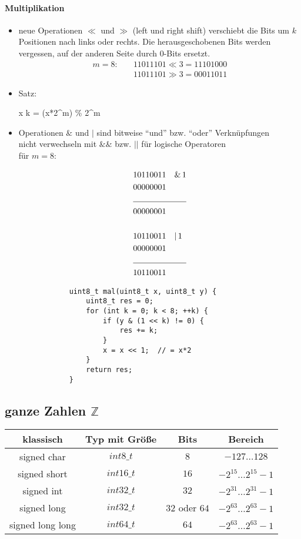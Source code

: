 \documentclass{article}
\begin{document}
\paragraph{Multiplikation}
	\begin{itemize}
		\item neue Operationen $\ll$ und $\gg$ (left und right shift)
		verschiebt die Bits um $k$ Positionen nach links oder rechts. Die herausgeschobenen Bits werden vergessen, auf der anderen Seite durch $0$-Bits ersetzt. \\
		\begin{align*}
			m = 8 : \quad & 11011101 \ll 3 = 11101000 \\
			& 11011101 \gg 3 = 00011011 
		\end{align*}
		\item Satz: \\
			\begin{flalign}
				x \ll k = (x*2^m) \% 2^m
			\end{flalign}
		\item Operationen $\&$ und $|$ sind bitweise ``und'' bzw. ``oder'' Verknüpfungen \\
		nicht verwechseln mit $\&\&$ bzw. $||$ für logische Operatoren \\ für $m=8:$

			\begin{align*}
				&1 0 1 1 0 0 1 1  \quad \& \, 1 \\
				&0 0 0 0 0 0 0 1 \\ \cline{1-2}
				&0 0 0 0 0 0 0 1 \\ \\
				&1 0 1 1 0 0 1 1 \quad | \, 1 \\
				&0 0 0 0 0 0 0 1 \\ \cline{1-2}
				&1 0 1 1 0 0 1 1			
			\end{align*}

		\begin{lstlisting}
			uint8_t mal(uint8_t x, uint8_t y) {
				uint8_t res = 0;
				for (int k = 0; k < 8; ++k) {
				    if (y & (1 << k) != 0) {
				    	res += k;
				    }
				    x = x << 1;  // = x*2
				}
				return res;
			}
		\end{lstlisting}	

	\end{itemize}

\subsection{ganze Zahlen $\mathbb{Z}$}
	\begin{tabular} {c|c|c|c}
		klassisch & Typ mit Größe & Bits & Bereich \\ \hline
		signed char & $int8\_t$ & $8$ & $-127 \dots 128$ \\
		signed short & $int16\_t$ & $16$ & $-2^{15} \dots 2^{15}-1 $ \\
		signed int & $int32\_t$ & $32$ & $-2^{31} \dots 2^{31}-1$ \\
		signed long & $int32\_t$ & $32$ oder $64$ & $-2^{63} \dots 2^{63}-1$\\
		signed long long & $int64\_t$ & $64$ & $-2^{63} \dots 2^{63}-1$ \\
	\end{tabular}
	
\end{document}
